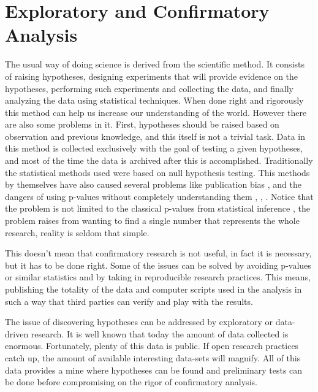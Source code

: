 
\section{Exploratory and Confirmatory Analysis}

The usual way of doing science is derived from the scientific method. It consists of raising hypotheses, designing experiments that will provide evidence on the hypotheses, performing such experiments and collecting the data, and finally analyzing the data using statistical techniques. When done right and rigorously this method can help us increase our understanding of the world. However there are also some problems in it. First, hypotheses should be raised based on observation and previous knowledge, and this itself is not a trivial task. Data in this method is collected exclusively with the goal of testing a given hypotheses, and most of the time the data is archived after this is accomplished. Traditionally the statistical methods used were based on null hypothesis testing. This methods by themselves have also caused several problems like publication bias \autocite{ioannidis_why_2005}, and the dangers of using p-values without completely understanding them \autocite{halsey_fickle_2015}, \autocite{nuzzo_scientific_2014}, \autocite{woolston_psychology_2015}. Notice that the problem is not limited to the classical p-values from statistical inference \autocite{gelman_so-called_2011}, the problem raises from wanting to find a single number that represents the whole research, reality is seldom that simple.    

This doesn't mean that confirmatory research is not useful, in fact it is necessary, but it has to be done right. Some of the issues can be solved by avoiding p-values or similar statistics and by taking in reproducible research practices. This means, publishing the totality of the data and computer scripts used in the analysis in such a way that third parties can verify and play with the results. 

The issue of discovering hypotheses can be addressed by exploratory or data-driven research. It is well known that today the amount of data collected is enormous. Fortunately, plenty of this data is public. If open research practices catch up, the amount of available interesting data-sets will magnify. All of this data provides a mine where hypotheses can be found and preliminary tests can be done before compromising on the rigor of confirmatory analysis. 


